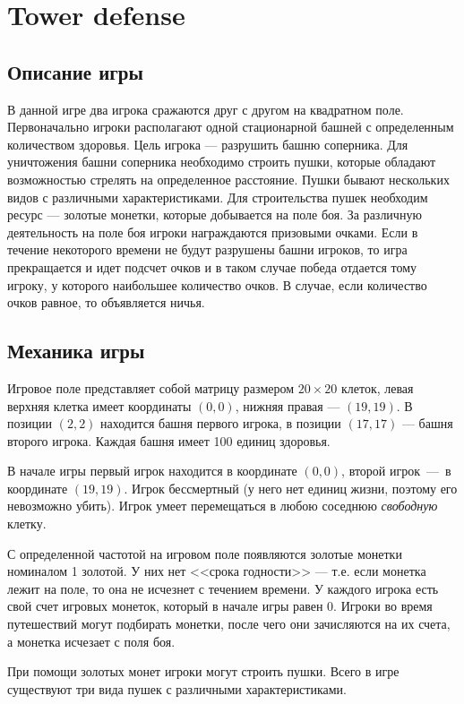 \documentclass[14pt]{extarticle}
\newcommand{\sectionCenter}[1]{\section*{\centering #1}}
\begin{document}


\sectionCenter{Tower defense}

\subsection*{Описание игры}
В данной игре два игрока сражаются друг с другом на квадратном поле. Первоначально игроки располагают одной стационарной башней с определенным количеством здоровья. Цель игрока --- разрушить башню соперника. Для уничтожения башни соперника необходимо строить пушки, которые обладают возможностью стрелять на определенное расстояние. Пушки бывают нескольких видов с различными характеристиками. Для строительства пушек необходим ресурс --- золотые монетки, которые добывается на поле боя. За различную деятельность на поле боя игроки награждаются призовыми очками. Если в течение некоторого времени не будут разрушены башни игроков, то игра прекращается и идет подсчет очков и в таком случае победа отдается тому игроку, у которого наибольшее количество очков. В случае, если количество очков равное, то объявляется ничья.

\subsection*{Механика игры}
Игровое поле представляет собой матрицу размером $20 \times 20$ клеток, левая верхняя клетка имеет координаты $(0, 0)$, нижняя правая --- $(19, 19)$. В позиции $(2, 2)$ находится башня первого игрока, в позиции $(17, 17)$ --- башня второго игрока. Каждая башня имеет 100 единиц здоровья.

В начале игры первый игрок находится в координате $(0, 0)$, второй игрок~---~в координате $(19, 19)$. Игрок бессмертный (у него нет единиц жизни, поэтому его невозможно убить). Игрок умеет перемещаться в любою соседнюю \emph{свободную} клетку.

С определенной частотой на игровом поле появляются золотые монетки номиналом 1 золотой. У них нет <<срока годности>> --- т.е. если монетка лежит на поле, то она не исчезнет с течением времени. У каждого игрока есть свой счет игровых монеток, который в начале игры равен 0. Игроки во время путешествий могут подбирать монетки, после чего они зачисляются на их счета, а монетка исчезает с поля боя.

При помощи золотых монет игроки могут строить пушки. Всего в игре существуют три вида пушек с различными характеристиками.
\end{document}
